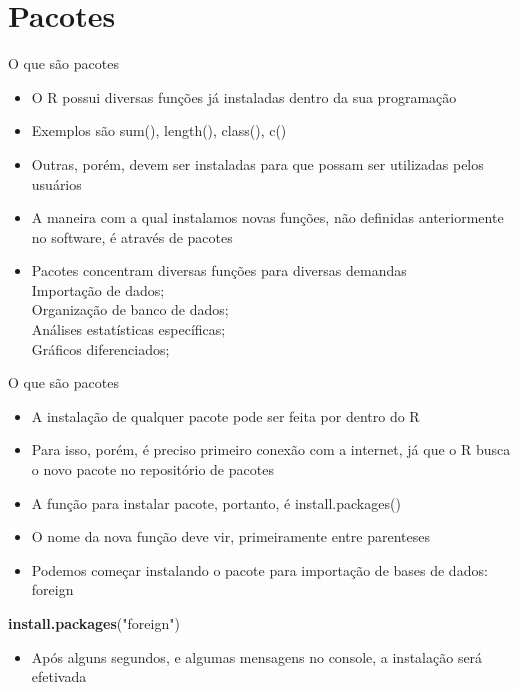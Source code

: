 \documentclass[
  10pt,
  ignorenonframetext,
]{beamer}
\newenvironment{Shaded}{\begin{snugshade}}{\end{snugshade}}
\newcommand{\KeywordTok}[1]{\textcolor[rgb]{0.13,0.29,0.53}{\textbf{#1}}}
\newcommand{\NormalTok}[1]{#1}
\newcommand{\StringTok}[1]{\textcolor[rgb]{0.31,0.60,0.02}{#1}}
\providecommand{\tightlist}{%
  \setlength{\itemsep}{0pt}\setlength{\parskip}{0pt}}
\begin{document}
\hypertarget{pacotes}{%
\section{Pacotes}\label{pacotes}}

\begin{frame}{O que são pacotes}
\protect\hypertarget{o-que-suxe3o-pacotes}{}
\begin{itemize}
\tightlist
\item
  O R possui diversas funções já instaladas dentro da sua programação
\item
  Exemplos são sum(), length(), class(), c()
\item
  Outras, porém, devem ser instaladas para que possam ser utilizadas
  pelos usuários
\item
  A maneira com a qual instalamos novas funções, não definidas
  anteriormente no software, é através de pacotes
\item
  Pacotes concentram diversas funções para diversas demandas\\
  Importação de dados;\\
  Organização de banco de dados;\\
  Análises estatísticas específicas;\\
  Gráficos diferenciados;
\end{itemize}
\end{frame}

\begin{frame}[fragile]{O que são pacotes}
\protect\hypertarget{o-que-suxe3o-pacotes-1}{}
\begin{itemize}
\tightlist
\item
  A instalação de qualquer pacote pode ser feita por dentro do R
\item
  Para isso, porém, é preciso primeiro conexão com a internet, já que o
  R busca o novo pacote no repositório de pacotes
\item
  A função para instalar pacote, portanto, é install.packages()
\item
  O nome da nova função deve vir, primeiramente entre parenteses
\item
  Podemos começar instalando o pacote para importação de bases de dados:
  foreign
\end{itemize}

\begin{Shaded}
\begin{Highlighting}[]
\KeywordTok{install.packages}\NormalTok{(}\StringTok{"foreign"}\NormalTok{)}
\end{Highlighting}
\end{Shaded}

\begin{itemize}
\tightlist
\item
  Após alguns segundos, e algumas mensagens no console, a instalação
  será efetivada
\end{itemize}
\end{frame}
\end{document}
